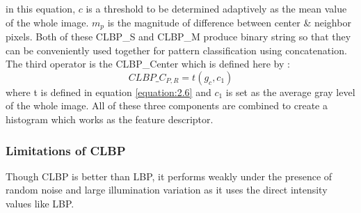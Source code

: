 \documentclass[12pt]{article}
\begin{document}
in this equation, $c$ is a threshold to be determined adaptively as the mean value of the whole image. $m_p$ is the magnitude of difference between center \& neighbor pixels.  Both of these CLBP\_S and CLBP\_M produce binary string so that they can be conveniently used together for pattern classification using concatenation. \\
\linebreak
The third operator is the CLBP\_Center  which is defined here by :
\begin{equation}
CLBP\_C_{P,R} = t(g_c,c_1)
\label{equation:2.7}
\end{equation}
where t is defined in equation \ref{equation:2.6} and $c_1$ is set as the average gray level of the whole image. All of these three components are combined to create a histogram which works as the feature descriptor.
\subsubsection*{Limitations of CLBP}
Though CLBP is better than LBP, it performs weakly under the presence of random noise and large illumination variation as it uses the direct intensity values like LBP.\\
\end{document}
